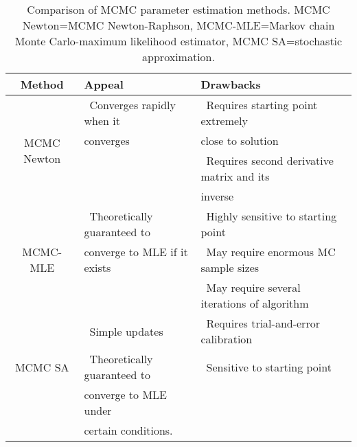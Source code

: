 \begin{table}[h] 
\caption[Comparison of MCMC parameter estimation methods]{Comparison of MCMC parameter estimation methods. MCMC Newton=MCMC Newton-Raphson,
MCMC-MLE=Markov chain Monte Carlo-maximum likelihood estimator, MCMC SA=stochastic approximation.}
\begin{tabular}{|c|l|l|}
\hline 
Method & Appeal & Drawbacks \\ [1ex]
\hline
\multirow{4}{0.5in}{MCMC Newton}
& 	\textbullet \, Converges rapidly when it   	& \textbullet \, Requires starting point extremely\\ 
& 	converges 	& close to solution \\				
&				& \textbullet \, Requires second derivative matrix and its\\
&				& inverse \\[1ex]
\hline
\multirow{3}{0.5in}{MCMC-MLE}
& 	\textbullet \, Theoretically guaranteed to   	& \textbullet \, Highly sensitive to starting point \\ 
& 	converge to MLE if it exists 					& \textbullet \, May require enormous MC sample sizes\\ 
&				& \textbullet \, May require several iterations of algorithm\\ [1ex]
\hline
\multirow{3}{0.5in}{MCMC SA} 		
& 	\textbullet \, Simple updates 				& \textbullet \, Requires trial-and-error calibration  \\			& 	\textbullet \, Theoretically guaranteed to		& \textbullet \, Sensitive to starting point \\
& 	converge to MLE under & \\
& 	certain conditions.  & \\[1ex]
\hline 
\end{tabular} 
\label{T:Compare MCMCestimation}
\end{table}



